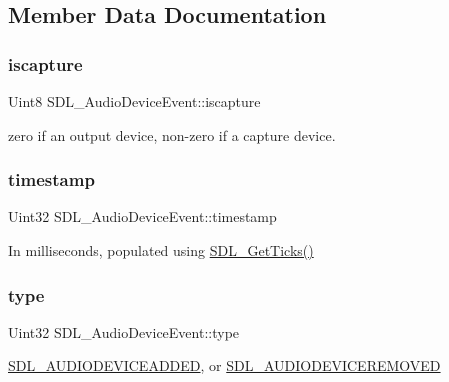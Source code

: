 \subsection{Member Data Documentation}
\mbox{\label{struct_s_d_l___audio_device_event_a1482dcd50b47046ef8e9bfa7cc7457d9}} 
\subsubsection{\texorpdfstring{iscapture}{iscapture}}
{\footnotesize\ttfamily Uint8 S\+D\+L\+\_\+\+Audio\+Device\+Event\+::iscapture}

zero if an output device, non-\/zero if a capture device. \mbox{\label{struct_s_d_l___audio_device_event_aa471680486a6103eafc9af569016df57}} 
\subsubsection{\texorpdfstring{timestamp}{timestamp}}
{\footnotesize\ttfamily Uint32 S\+D\+L\+\_\+\+Audio\+Device\+Event\+::timestamp}

In milliseconds, populated using \mbox{\hyperlink{_s_d_l__timer_8h_a0b9bc71d6287e0ffafdc3419760fe2b3}{S\+D\+L\+\_\+\+Get\+Ticks()}} \mbox{\label{struct_s_d_l___audio_device_event_ae68c3bd49b49608711a17395c7cbfe58}} 
\subsubsection{\texorpdfstring{type}{type}}
{\footnotesize\ttfamily Uint32 S\+D\+L\+\_\+\+Audio\+Device\+Event\+::type}

\mbox{\hyperlink{_s_d_l__events_8h_a3b589e89be6b35c02e0dd34a55f3fccaadb3154654baf003910e75d74b507a82b}{S\+D\+L\+\_\+\+A\+U\+D\+I\+O\+D\+E\+V\+I\+C\+E\+A\+D\+D\+ED}}, or \mbox{\hyperlink{_s_d_l__events_8h_a3b589e89be6b35c02e0dd34a55f3fccaad56f8934fe24ee4c0cd9329e3c57c0c2}{S\+D\+L\+\_\+\+A\+U\+D\+I\+O\+D\+E\+V\+I\+C\+E\+R\+E\+M\+O\+V\+ED}} \mbox{\label{struct_s_d_l___audio_device_event_ac91d70fd4e1dd596185fed061388896c}} 
